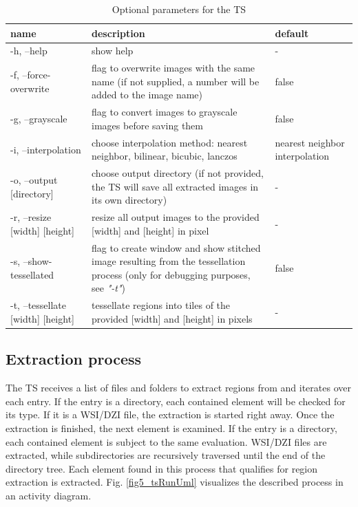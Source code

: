 \begin{table}[H]
	\begin{center}
		\begin{tabular}{| p{3cm} | p{5cm} | p{3cm} |}
			\hline
			\textbf{name} & \textbf{description} & \textbf{default}\\ \hline
			-h, --help & show help & - \\ \hline
			-f, --force-overwrite & flag to overwrite images with the same name (if not supplied, a number will be added to the image name) & false \\ \hline
			-g, --grayscale & flag to convert images to grayscale images before saving them & false \\ \hline
			-i, --interpolation & choose interpolation method: nearest neighbor, bilinear, bicubic, lanczos  & nearest neighbor interpolation \\ \hline
			-o, --output [directory] & choose output directory (if not provided, the TS will save all extracted images in its own directory) & - \\ \hline
			-r, --resize [width] [height] & resize all output images to the provided [width] and [height] in pixel & - \\ \hline
			-s, --show-tessellated & flag to create window and show stitched image resulting from the tessellation process (only for debugging purposes, see \emph{"-t"}) & false\\ \hline
			-t, --tessellate [width] [height] & tessellate regions into tiles of the provided [width] and [height] in pixels & - \\ \hline
		\end{tabular}
		\caption{Optional parameters for the TS}
		\label{tab5_tsParams}
	\end{center}
\end{table}


\subsection{Extraction process}

The TS receives a list of files and folders to extract regions from and iterates over each entry. If the entry is a directory, each contained element will be checked for its type. If it is a WSI/DZI file, the extraction is started right away. Once the extraction is finished, the next element is examined. If the entry is a directory, each contained element is subject to the same evaluation. WSI/DZI files are extracted, while subdirectories are recursively traversed until the end of the directory tree. Each element found in this process that qualifies for region extraction is extracted. Fig. \ref{fig5_tsRunUml} visualizes the described process in an activity diagram.

